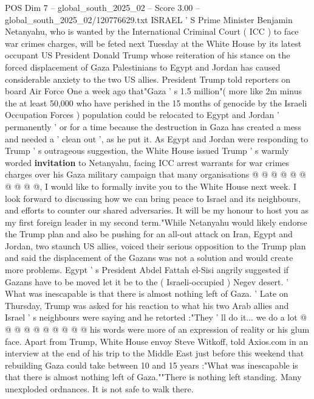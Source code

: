 \begin{textsample}{POS Dim 7 – global\_south\_2025\_02 – Score 3.00 – global\_south\_2025\_02/120776629.txt}  \label{ex:f7_pos_419}
ISRAEL ' S Prime Minister Benjamin Netanyahu, who is wanted by the International Criminal Court ( ICC ) to face war crimes charges, will be feted next Tuesday at the White House by its latest occupant US President Donald Trump whose reiteration of his stance on the forced displacement of Gaza Palestinians to Egypt and Jordan has caused considerable anxiety to the two US allies.
President Trump told reporters on board Air Force One a week ago that"Gaza ' s 1.5 million"( more like 2m minus the at least 50,000 who have perished in the 15 months of genocide by the Israeli Occupation Forces ) population could be relocated to Egypt and Jordan ' permanently ' or for a time because the destruction in Gaza has created a mess and needed a ' clean out ', as he put it.
As Egypt and Jordan were responding to Trump ' s outrageous suggestion, the White House issued Trump ' s warmly worded \textbf{invitation} to Netanyahu, facing ICC arrest warrants for war crimes charges over his Gaza military campaign that many organisations @ @ @ @ @ @ @ @ @ @, I would like to formally invite you to the White House next week.
I look forward to discussing how we can bring peace to Israel and its neighbours, and efforts to counter our shared adversaries.
It will be my honour to host you as my first foreign leader in my second term."While Netanyahu would likely endorse the Trump plan and also be pushing for an all-out attack on Iran, Egypt and Jordan, two staunch US allies, voiced their serious opposition to the Trump plan and said the displacement of the Gazans was not a solution and would create more problems.
Egypt ' s President Abdel Fattah el-Sisi angrily suggested if Gazans have to be moved let it be to the ( Israeli-occupied ) Negev desert. ' What was inescapable is that there is almost nothing left of Gaza. ' Late on Thursday, Trump was asked for his reaction to what his two Arab allies and Israel ' s neighbours were saying and he retorted :"They ' ll do it... we do a lot @ @ @ @ @ @ @ @ @ @ his words were more of an expression of reality or his glum face.
Apart from Trump, White House envoy Steve Witkoff, told Axios.com in an interview at the end of his trip to the Middle East just before this weekend that rebuilding Gaza could take between 10 and 15 years :"What was inescapable is that there is almost nothing left of Gaza.""There is nothing left standing.
Many unexploded ordnances.
It is not safe to walk there.

\end{textsample}
